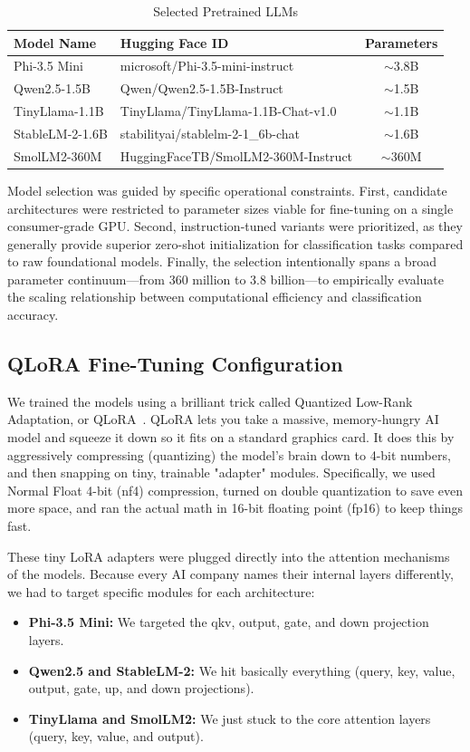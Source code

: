 \documentclass[journal]{IEEEtran}
\begin{document}
\begin{table}[htbp]
\caption{Selected Pretrained LLMs}
\label{tab:models}
\centering
\begin{tabular}{llc}
\toprule
\textbf{Model Name} & \textbf{Hugging Face ID} & \textbf{Parameters} \\
\midrule
Phi-3.5 Mini & microsoft/Phi-3.5-mini-instruct & $\sim$3.8B \\
Qwen2.5-1.5B & Qwen/Qwen2.5-1.5B-Instruct & $\sim$1.5B \\
TinyLlama-1.1B & TinyLlama/TinyLlama-1.1B-Chat-v1.0 & $\sim$1.1B \\
StableLM-2-1.6B & stabilityai/stablelm-2-1\_6b-chat & $\sim$1.6B \\
SmolLM2-360M & HuggingFaceTB/SmolLM2-360M-Instruct & $\sim$360M \\
\bottomrule
\end{tabular}
\end{table}

Model selection was guided by specific operational constraints. First, candidate architectures were restricted to parameter sizes viable for fine-tuning on a single consumer-grade GPU. Second, instruction-tuned variants were prioritized, as they generally provide superior zero-shot initialization for classification tasks compared to raw foundational models. Finally, the selection intentionally spans a broad parameter continuum---from 360 million to 3.8 billion---to empirically evaluate the scaling relationship between computational efficiency and classification accuracy.

\subsection{QLoRA Fine-Tuning Configuration}

We trained the models using a brilliant trick called Quantized Low-Rank Adaptation, or QLoRA~\cite{ref11}. QLoRA lets you take a massive, memory-hungry AI model and squeeze it down so it fits on a standard graphics card. It does this by aggressively compressing (quantizing) the model's brain down to 4-bit numbers, and then snapping on tiny, trainable "adapter" modules. Specifically, we used Normal Float 4-bit (nf4) compression, turned on double quantization to save even more space, and ran the actual math in 16-bit floating point (fp16) to keep things fast.

These tiny LoRA adapters were plugged directly into the attention mechanisms of the models. Because every AI company names their internal layers differently, we had to target specific modules for each architecture:
\begin{itemize}
    \item \textbf{Phi-3.5 Mini:} We targeted the qkv, output, gate, and down projection layers.
    \item \textbf{Qwen2.5 and StableLM-2:} We hit basically everything (query, key, value, output, gate, up, and down projections).
    \item \textbf{TinyLlama and SmolLM2:} We just stuck to the core attention layers (query, key, value, and output).
\end{itemize}
\end{document}
